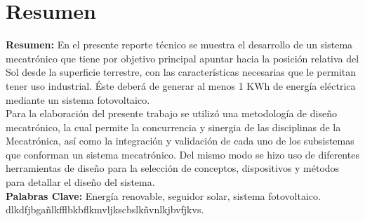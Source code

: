 \chapter{Resumen}


\textbf{Resumen:} En el presente reporte técnico se muestra el desarrollo de un sistema mecatrónico que tiene por objetivo principal apuntar hacia la posición relativa del Sol desde la superficie terrestre, con las características necesarias que le permitan tener uso industrial. Éste deberá de generar al menos 1 KWh de energía eléctrica mediante un sistema fotovoltaico.\\

Para la elaboración del presente trabajo se utilizó una metodología de diseño mecatrónico, la cual permite la concurrencia y sinergia de las disciplinas de la Mecatrónica, así como la integración y validación de cada uno de los subsistemas que conforman un sistema mecatrónico. Del mismo modo se hizo uso de diferentes herramientas de diseño para la selección de conceptos, dispositivos y métodos para detallar el diseño del sistema.\\


\textbf{Palabras Clave:} Energía renovable, seguidor solar, sistema fotovoltaico. \\

dlkdfjbgañlkfflbkbflkmvljkscbslkñvnlkjbvfjkvs.



\endinput 